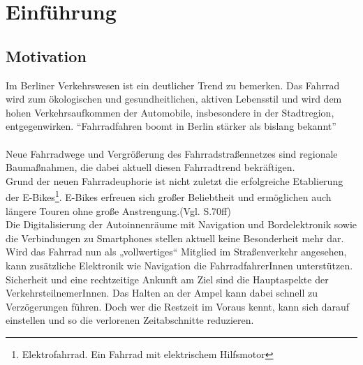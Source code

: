 \chapter{\label{chap:einleitung}Einführung}
\section{Motivation}
Im Berliner Verkehrswesen ist ein deutlicher Trend zu bemerken. Das Fahrrad wird zum ökologischen und gesundheitlichen, aktiven Lebensstil und wird dem hohen Verkehrsaufkommen der Automobile, insbesondere in der Stadtregion, entgegenwirken. “Fahrradfahren boomt in Berlin stärker als bislang bekannt”\cite{Mopo}\\\\
Neue Fahrradwege und Vergrößerung des Fahrradstraßennetzes sind regionale Baumaßnahmen, die dabei aktuell diesen Fahrradtrend bekräftigen. \cite{Mopo} \\
Grund der neuen Fahrradeuphorie ist nicht zuletzt die erfolgreiche Etablierung der E-Bikes\footnote{ Elektrofahrrad. Ein Fahrrad mit elektrischem Hilfsmotor}. E-Bikes erfreuen sich großer Beliebtheit und ermöglichen auch längere Touren ohne große Anstrengung.(Vgl. \cite{ebikes} S.70ff)\\ 
Die Digitalisierung der Autoinnenräume mit Navigation und Bordelektronik sowie die Verbindungen zu \glspl{Smartphone} stellen aktuell keine Besonderheit mehr dar. Wird das Fahrrad nun als „vollwertiges“ Mitglied im Straßenverkehr angesehen, kann zusätzliche Elektronik wie Navigation die FahrradfahrerInnen unterstützen. Sicherheit und eine rechtzeitige Ankunft am Ziel sind die Hauptaspekte der VerkehrsteilnemerInnen. Das Halten an der Ampel kann dabei schnell zu Verzögerungen führen. Doch wer die Restzeit im Voraus kennt, kann sich darauf einstellen und so die verlorenen Zeitabschnitte reduzieren.
